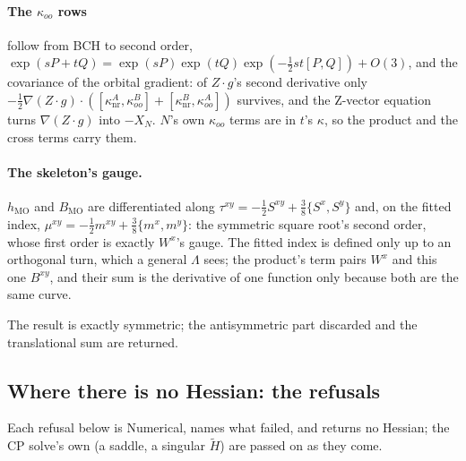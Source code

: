 \documentclass[11pt]{article}
\newcommand{\Lb}{\Lambda}
\begin{document}
\paragraph{The $\kappa_{oo}$ rows} follow from BCH to second order,
$\exp(sP + tQ) = \exp(sP)\exp(tQ)\exp(-\tfrac12 st[P, Q]) + O(3)$, and the
covariance of the orbital gradient: of $Z\cdot g$'s second derivative only
$-\tfrac12\nabla(Z\cdot g)\cdot([\kappa^A_{\mathrm{nr}}, \kappa^B_{oo}] +
[\kappa^B_{\mathrm{nr}}, \kappa^A_{oo}])$ survives, and the Z-vector equation
turns $\nabla(Z\cdot g)$ into $-X_N$. $N$'s own $\kappa_{oo}$ terms are in
$t$'s $\kappa$, so the product and the cross terms carry them.

\paragraph{The skeleton's gauge.} $h_{\mathrm{MO}}$ and $B_{\mathrm{MO}}$ are
differentiated along
$\tau^{xy} = -\tfrac12 S^{xy} + \tfrac38\{S^x, S^y\}$ and, on the fitted
index, $\mu^{xy} = -\tfrac12 m^{xy} + \tfrac38\{m^x, m^y\}$: the symmetric
square root's second order, whose first order is exactly $W^x$'s gauge. The
fitted index is defined only up to an orthogonal turn, which a general
$\Lb$ sees; the product's term pairs $W^x$ and this one $B^{xy}$, and their
sum is the derivative of one function only because both are the same curve.

The result is exactly symmetric; the antisymmetric part discarded and the
translational sum are returned.

\subsection{Where there is no Hessian: the refusals}
\label{sec:hess-refusals}

Each refusal below is Numerical, names what failed, and returns no
Hessian; the CP solve's own (a saddle, a singular $\tilde H$) are passed on
as they come.
\end{document}
